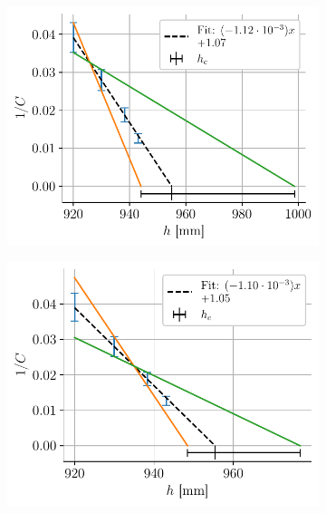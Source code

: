 \begin{figure}[H]
    \centering
    \begin{subfigure}{0.48\linewidth}
        \centering
        \includegraphics[width=\linewidth]{figures/h_C_pair12.pdf}
        \caption{}
        \label{fig:hc_C_12}
    \end{subfigure}
    \begin{subfigure}{0.48\linewidth}
        \centering
        \includegraphics[width=\linewidth]{figures/h_C_pair23.pdf}
        \caption{}
        \label{fig:hc_C_23}
    \end{subfigure}
    \begin{subfigure}{0.48\linewidth}

\end{subfigure}
\end{figure}
